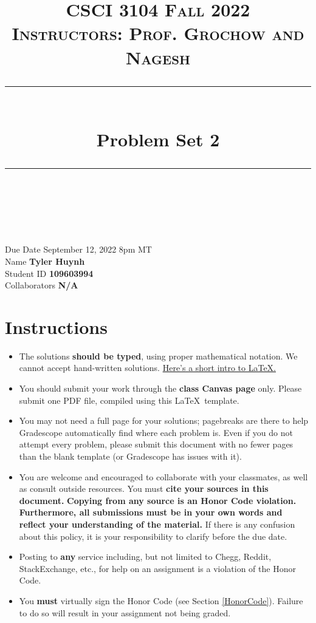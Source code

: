 \documentclass[11pt]{article}
\title{
\normalfont \normalsize 
\textsc{CSCI 3104 Fall 2022 \\ 
Instructors: Prof. Grochow and Nagesh} \\
[10pt] 
\rule{\linewidth}{0.5pt} \\[6pt] 
\huge Problem Set 2 \\
\rule{\linewidth}{2pt}  \\[10pt]
}
\date{}
\theoremstyle{definition}
\theoremstyle{definition}
\theoremstyle{definition}
\begin{document}

\maketitle


\noindent
Due Date \dotfill September 12, 2022 8pm MT\\
Name \dotfill \textbf{Tyler Huynh} \\
Student ID \dotfill \textbf{109603994} \\
Collaborators \dotfill \textbf{N/A}

\tableofcontents

\section*{Instructions}

 \begin{itemize}
	\item The solutions \textbf{should be typed}, using proper mathematical notation. We cannot accept hand-written solutions. \href{http://ece.uprm.edu/~caceros/latex/introduction.pdf}{Here's a short intro to \LaTeX.}
	\item You should submit your work through the \textbf{class Canvas page} only. Please submit one PDF file, compiled using this \LaTeX \ template.
	\item You may not need a full page for your solutions; pagebreaks are there to help Gradescope automatically find where each problem is. Even if you do not attempt every problem, please submit this document with no fewer pages than the blank template (or Gradescope has issues with it).

	\item You are welcome and encouraged to collaborate with your classmates, as well as consult outside resources. You must \textbf{cite your sources in this document.} \textbf{Copying from any source is an Honor Code violation. Furthermore, all submissions must be in your own words and reflect your understanding of the material.} If there is any confusion about this policy, it is your responsibility to clarify before the due date. 

	\item Posting to \textbf{any} service including, but not limited to Chegg, Reddit, StackExchange, etc., for help on an assignment is a violation of the Honor Code.

	\item You \textbf{must} virtually sign the Honor Code (see Section \ref{HonorCode}). Failure to do so will result in your assignment not being graded.
\end{itemize}
\end{document}
